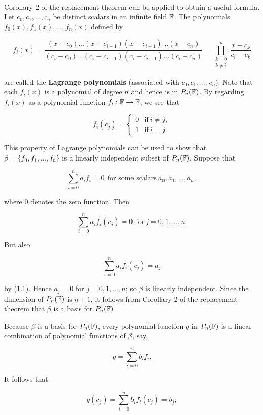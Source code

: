 \begin{definition}
	\hfill\\
	Corollary 2 of the replacement theorem can be applied to obtain a useful formula. Let $c_0, c_1, \dots, c_n$ be distinct scalars in an infinite field $\mathbb{F}$. The polynomials $f_0(x), f_1(x), \dots, f_n(x)$ defined by
	
	\[f_i(x) = \frac{(x-c_0)\dots(x-c_{i-1})(x-c_{i+1})\dots(x-c_n)}{(c_i - c_0)\dots(c_i-c_{i-1})(c_i-c_{i+1})\dots(c_i-c_n)} = \prod_{\substack{k=0 \\ k \neq i}}^{n} \frac{x-c_k}{c_i - c_k}\]
	
	are called the \textbf{Lagrange polynomials} (associated with $c_0, c_1, \dots, c_n$). Note that each $f_i(x)$ is a polynomial of degree $n$ and hence is in $P_n(\mathbb{F})$. By regarding $f_i(x)$ as a polynomial function $f_i: \mathbb{F} \to \mathbb{F}$, we see that 
	
	\begin{equation}
		f_i(c_j) = \begin{cases}
			0 &\text{if}\ i \neq j,\\
			1 &\text{if}\ i = j.
		\end{cases}
	\end{equation}
	
	This property of Lagrange polynomials can be used to show that $\beta = \{f_0, f_1, \dots, f_n\}$ is a linearly independent subset of $P_n(\mathbb{F})$. Suppose that 
	
	\[\sum_{i=0}^{n}a_if_i = 0\ \ \text{for some scalars}\ a_0, a_1, \dots, a_n,\]
	
	where $0$ denotes the zero function. Then
	
	\[\sum_{i=0}^{n}a_if_i(c_j)=0\ \ \text{for}\ j=0, 1, \dots, n.\]
	
	But also
	
	\[\sum_{i=0}^{n}a_if_i(c_j)=a_j\]
	
	by (1.1). Hence $a_j = 0$ for $j = 0, 1, \dots, n$; so $\beta$ is linearly independent. Since the dimension of $P_n(\mathbb{F})$ is $n + 1$, it follows from Corollary 2 of the replacement theorem that $\beta$ is a basis for $P_n(\mathbb{F})$.
	
	Because $\beta$ is a basis for $P_n(\mathbb{F})$, every polynomial function $g$ in $P_n(\mathbb{F})$ is a linear combination of polynomial functions of $\beta$, say,
	
	\[g = \sum_{i=0}^{n}b_if_i.\]
	
	It follows that 
	
	\[g(c_j)=\sum_{i=0}^{n}b_if_i(c_j)=b_j;\]
	

\end{definition}
